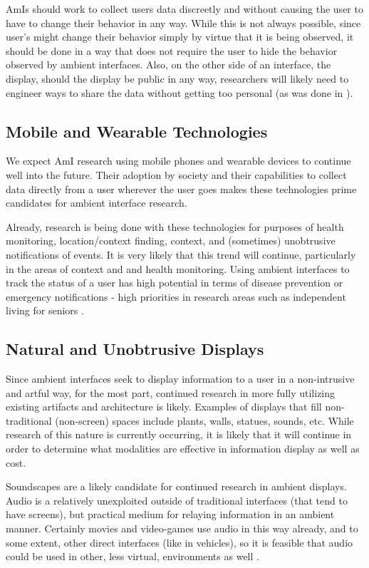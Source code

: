 \documentclass{article}
\begin{document}
AmIs should work to collect users data discreetly and without causing the user to have to change their behavior in any way. While this is not always possible, since user's might change their behavior simply by virtue that it is being observed, it should be done in a way that does not require the user to hide the behavior observed by ambient interfaces. Also, on the other side of an interface, the display, should the display be public in any way, researchers will likely need to engineer ways to share the data without getting too personal (as was done in \cite{Baharin:2015:SSI:2798442.2754165}).

%
\subsection{Mobile and Wearable Technologies}
We expect AmI research using mobile phones and wearable devices to continue well into the future. Their adoption by society and their capabilities to collect data directly from a user wherever the user goes makes these technologies prime candidates for ambient interface research.

Already, research is being done with these technologies for purposes of health monitoring, location/context finding, context, and (sometimes) unobtrusive notifications of events. It is very likely that this trend will continue, particularly in the areas of context and and health monitoring. Using ambient interfaces to track the status of a user has high potential in terms of disease prevention or emergency notifications - high priorities in research areas such as independent living for seniors \cite{Cook2009277} \cite{Sadri:2011:AIS:1978802.1978815}. 

%
\subsection{Natural and Unobtrusive Displays}
Since ambient interfaces seek to display information to a user in a non-intrusive and artful way, for the most part, continued research in more fully utilizing existing artifacts and architecture is likely. Examples of displays that fill non-traditional (non-screen) spaces include plants, walls, statues, sounds, etc. While research of this nature is currently occurring, it is likely that it will continue in order to determine what modalities are effective in information display as well as cost.

Soundscapes are a likely candidate for continued research in ambient displays. Audio is a relatively unexploited outside of traditional interfaces (that tend to have screens), but practical medium for relaying information in an ambient manner. Certainly movies and video-games use audio in this way already, and to some extent, other direct interfaces (like in vehicles), so it is feasible that audio could be used in other, less virtual, environments as well \cite{Baharin:2015:SSI:2798442.2754165}.
\end{document}
